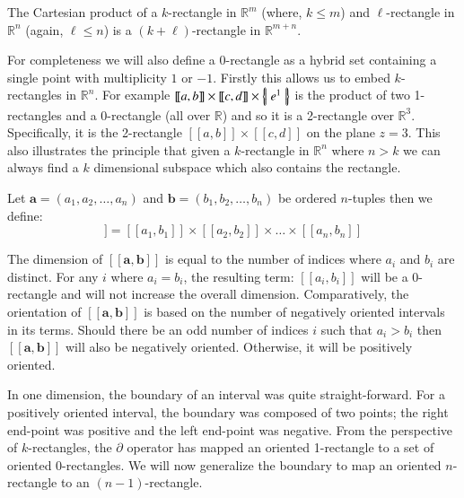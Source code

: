 \begin{theorem}
	The Cartesian product of a $k$-rectangle in $\mathbb{R}^m$ (where, $k\leq m$) 
	and $\ell$-rectangle in $\mathbb{R}^n$ (again, $\ell \leq n$) 
	is a $(k+\ell)$-rectangle in $\mathbb{R}^{m+n}$.
\end{theorem}

For completeness we will also define a 0-rectangle as a hybrid set containing a single point with multiplicity $1$ or $-1$.
Firstly this allows us to embed $k$-rectangles in $\mathbb{R}^n$.
For example $[\![a,b]\!] \times [\![c,d]\!] \times \left\{ \! \left| \; e^1 \; \right| \! \right\}$ is the product of two 1-rectangles and a 0-rectangle (all over $\mathbb{R}$) and so it is a 2-rectangle over $\mathbb{R}^3$.
Specifically, it is the 2-rectangle $[\![a,b]\!] \times [\![c,d]\!]$ on the plane $z=3$.
This also illustrates the principle that given a $k$-rectangle in $\mathbb{R}^n$ where $n>k$ we can always find a $k$ dimensional subspace which also contains the rectangle.


\begin{definition}
	Let $\boldsymbol{a} = (a_1, a_2, \ldots, a_n)$ and 
	$\boldsymbol{b} = (b_1, b_2, \ldots, b_n)$ be ordered $n$-tuples then we define:
	\begin{equation*}
		[\![ \boldsymbol{a}, \boldsymbol{b} ]\!] 
		= [\![a_1, b_1]\!] \times [\![a_2, b_2 ]\!] \times \ldots \times [\![a_n , b_n]\!]
	\end{equation*}
\end{definition}

The dimension of $[\![ \boldsymbol{a}, \boldsymbol{b} ]\!]$ is equal to the number of indices where $a_i$ and $b_i$ are distinct.
For any $i$ where $a_i = b_i$, the resulting term: $[\![ a_i, b_i ]\!]$ will be a 0-rectangle and will not increase the overall dimension.
Comparatively, the orientation of $[\![ \boldsymbol{a}, \boldsymbol{b} ]\!]$ is based on the number of negatively oriented intervals in its terms.
Should there be an odd number of indices $i$ such that $a_i > b_i$ then $[\![ \boldsymbol{a}, \boldsymbol{b} ]\!]$ will also be negatively oriented.
Otherwise, it will be positively oriented. 


In one dimension, the boundary of an interval was quite straight-forward.
For a positively oriented interval, the boundary was composed of two points; 
the right end-point was positive and the left end-point was negative.
From the perspective of $k$-rectangles, 
the $\partial$ operator has mapped an oriented 1-rectangle to a set of oriented 0-rectangles.
We will now generalize the boundary to map an oriented $n$-rectangle to an $(n-1)$-rectangle.

